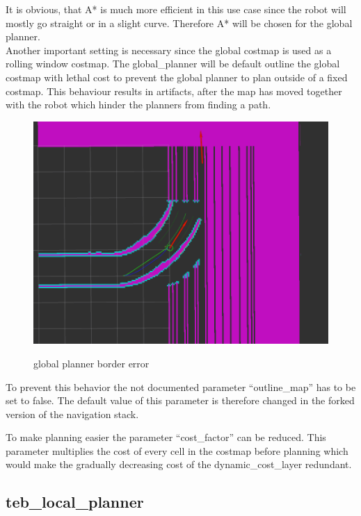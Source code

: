 It is obvious, that A* is much more efficient in this use case since the robot will mostly go straight or in a slight curve. Therefore A* will be chosen for the global planner.\\

Another important setting is necessary since the global costmap is used as a rolling window costmap. The global\_planner will be default outline the global costmap with lethal cost to prevent the global planner to plan outside of a fixed costmap. This behaviour results in artifacts, after the map has moved together with the robot which hinder the planners from finding a path.

\begin{figure}[H]
	\centering
	\includegraphics[width=\textwidth]{Pictures/borders}
	\label{boardererror}
	\caption{global planner border error}
\end{figure}

To prevent this behavior the not documented parameter ``outline\_map'' has to be set to false. The default value of this parameter is therefore changed in the forked version of the navigation stack.

To make planning easier the parameter ``cost\_factor'' can be reduced. This parameter multiplies the cost of every cell in the costmap before planning which
 would make the gradually decreasing cost of the dynamic\_cost\_layer redundant.

\subsection{teb\_local\_planner}

